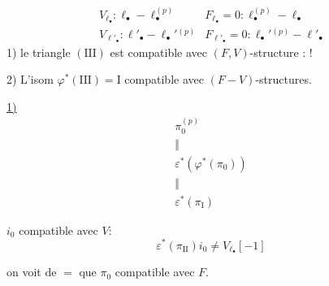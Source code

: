 \[
\begin{array}{ll}
V_{\ell_{\bullet}}:\ell_{\bullet}\mathbin{-}\ell_{\bullet}^{(p)}&F_{\ell_{\bullet}}=0:\ell_{\bullet}^{(p)}\mathbin{-}\ell_{\bullet}\\
V_{\ell'_{\bullet}}:\ell'_{\bullet}\mathbin{-}\ell_{\bullet}'{}^{(p)}&F_{\ell'_{\bullet}}=0:\ell_{\bullet}'{}^{(p)}\mathbin{-}\ell'_{\bullet}
\end{array}
\]
1) le triangle $(\mathrm {III})$ est compatible avec $(F,V)$-structure :  !

2) L'isom $\varphi^*(\mathrm {III})=\mathrm I$ compatible avec $(F-V)$-structures.

\qquad{}

\uline{1)}
\[
\begin{gathered}\pi_0^{(p)}\\\Vert\\\varepsilon^*(\varphi^*(\pi_0))\\\Vert\\\varepsilon^*(\pi_{\mathrm I})\end{gathered}
\]

$i_0$ compatible avec $V$:
\[
\varepsilon^*(\pi_{\mathrm {II}})i_0\ne V_{\ell_{\bullet}}[-1]
\]

on voit de $=$ que $\pi_0$ compatible avec $F$.

